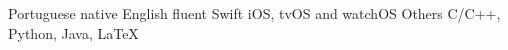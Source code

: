\begin{cvskills}
  \cvskill
    {Portuguese}
    {native}
  \cvskill
    {English}
    {fluent}
  \cvskill
    {Swift}
    {iOS, tvOS and watchOS}
  \cvskill
    {Others}
    {C/C++, Python, Java, \LaTeX}
\end{cvskills}

